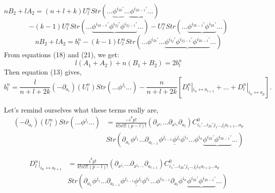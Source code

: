 \documentclass[a4paper,12pt]{article}
\begin{document}
$nB_2+lA_2=(n+l+k)U^n_l Str\left(\ldots \underbrace{\phi^{i_{2k}'}}\ldots \underbrace{\phi^{i_{2k-1}'}}\ldots \right)$
\begin{equation}
-(k-1) U^n_l Str\left(\ldots \underbrace{\phi^{i_{2k-1}'}\phi^{i_{2j}'}\phi^{i_{2j-1}'}}\ldots \right)- U^n_l Str\left(\ldots \underbrace{\phi^{i_{2k-1}'}\phi^{i_{2k}'}}\ldots \right)
\end{equation}
\begin{equation}
nB_2+lA_2= b^n_l-(k-1)U^n_l Str\left(\ldots \phi^{i_{2k}'}\ldots \underbrace{\phi^{i_{2j}'}\phi^{i_{2j-1}'}\phi^{i_{2k-1}'}}\ldots \right)
\end{equation}
From equations (18) and (21), we get:
\begin{equation}
l(A_1+A_2)+n(B_1+B_2)= 2b^n_l
\end{equation}
Then equation (13)  gives,
\begin{equation}
b^n_l=\frac{l}{n+l+2k}(-\partial_{a_l})(U^n_l)Str\left(\ldots \phi^{j_l}\ldots \right)-\frac{n}{n+l+2k}\left[D^n_l|_{i_n\leftrightarrow a_{l+1}}+\ldots +D^n_l|_{i_n\leftrightarrow a_p}\right]. 
\end{equation}

Let's remind ourselves what these terms really are,
\begin{equation}
\begin{split}
(-\partial_{a_l})(U^n_l)Str\left(\ldots \phi^{j_l}\ldots \right)&=\frac{-i^kp!}{k!n!l!(p-l)!}\left(\partial_{x^{i_1}}\ldots \partial_{x^{i_n}}\partial_{a_l}\right) C^0_{i_1'\ldots i_{2k}'j_1\ldots j_la_{l+1}\ldots a_p} \\
  &  Str\left(\partial_{a_1}\phi^{j_1}\ldots \partial_{a_{l-1}}\phi^{j_{l-1}}\underline{\phi}^{j_l}\phi^{i_1}\ldots \phi^{i_n}\underbrace{\phi^{i_{2k}'}\phi^{i_{2k-1}'}}\ldots \right)
\end{split} 
\end{equation}

\begin{equation}
\begin{split}
D^n_l|_{i_n\leftrightarrow a_{l+1}} &=\frac{i^kp!}{k!n!l!(p-l)!}\left(\partial_{x^{i_1}}\ldots \partial_{x^{i_{n-1}}}\partial_{a_{l+1}}\right) C^0_{i_1'\ldots i_{2k}'j_1\ldots j_li_na_{l+2}\ldots a_p} \\
 &Str\left(\partial_{a_1}\phi^{j_1}\ldots \partial_{a_{l-1}}\phi^{j_{l-1}}\underline{\phi}^{j_l}\phi^{i_1}\ldots \phi^{i_{n-1}}\partial_{a_l}\phi^{i_n}\underbrace{\phi^{i_{2k}'}\phi^{i_{2k-1}'}}\ldots \right)
\end{split}
\end{equation}
\end{document}
